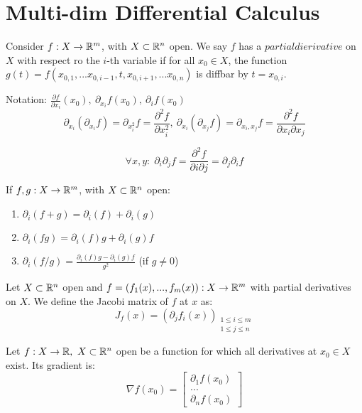 \chapter{Multi-dim Differential Calculus}

\begin{definition}
	Consider $f: X \to \mathbb{R}^m$, with $X \subset \mathbb{R}^n$ open.
	We say $f$ has a $partial dierivative$ on $X$ with respect ro the $i$-th variable if for all $x_0 \in X$, the function $g(t) = f(x_{0,1},...x_{0,i-1},t,x_{0,i+1},...x_{0,n})$ is diffbar by $t = x_{0,i}$.
	
	Notation: $\frac{\partial f}{\partial x_i}(x_0), \ \partial_{x_i}f(x_0), \ \partial_if(x_0)$
	$$\partial_{x_i}(\partial_{x_i} f) = \partial_{x_i^2}f = \frac{\partial^2 f}{\partial x_i^2}, \ \partial_{x_i}(\partial_{x_j} f) = \partial_{x_i, x_j}f = \frac{\partial^2 f}{\partial x_i \partial x_j}$$
\end{definition}

\begin{theorem}
	$$\forall x,y:\; \partial_i \partial_j f = \frac{\partial^2 f}{\partial i \partial j} = \partial_j \partial_i f$$
\end{theorem}

\begin{proposition}
	If $f,g: X \to \mathbb{R}^m$, with $X \subset \mathbb{R}^n$ open:
	\begin{enumerate}
		\item $\partial_i(f+g) = \partial_i(f) + \partial_i(g)$
		\item $\partial_i(fg) = \partial_i(f)g + \partial_i(g)f$
		\item $\partial_i(f/g) = \frac{\partial_i(f)g - \partial_i(g)f}{g^2}$ (if $g \neq 0$)
	\end{enumerate}
\end{proposition}

\begin{definition}
	Let $X \subset \mathbb{R}^n$ open and $f=(f_1(x), ..., f_m(x)): X \to \mathbb{R}^m$ with partial derivatives on $X$.
	We define the Jacobi matrix of $f$ at $x$ as:
	$$J_f(x) = (\partial_j f_i(x))_{\substack{1 \leq i \leq m \\ 1 \leq j \leq n}}$$
\end{definition}

\begin{definition}[Gradient]
	Let $f: X \to \mathbb{R}, \  X \subset \mathbb{R}^n $ open be a function for which all derivatives at $x_0\in X$ exist.
	Its gradient is:
	$$\nabla f(x_0) = \begin{bmatrix} \partial_1 f(x_0) \\ ... \\ \partial_n f(x_0) \end{bmatrix}$$
\end{definition}

